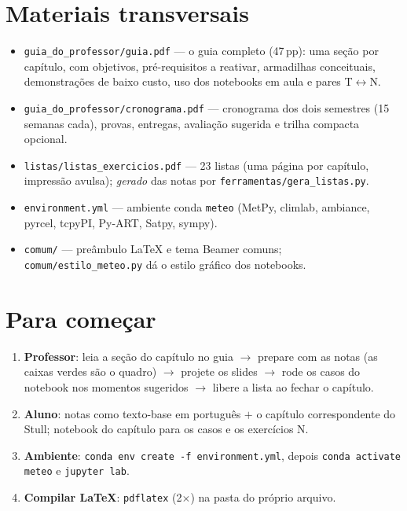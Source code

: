 \documentclass[11pt]{article}
\begin{document}
\section*{Materiais transversais}

\begin{itemize}
  \item \texttt{guia\_do\_professor/guia.pdf} --- o guia completo
        (47\,pp): uma seção por capítulo, com objetivos,
        pré-requisitos a reativar, armadilhas conceituais,
        demonstrações de baixo custo, uso dos notebooks em aula e
        pares T$\leftrightarrow$N.
  \item \texttt{guia\_do\_professor/cronograma.pdf} --- cronograma
        dos dois semestres (15 semanas cada), provas, entregas,
        avaliação sugerida e trilha compacta opcional.
  \item \texttt{listas/listas\_exercicios.pdf} --- 23 listas (uma
        página por capítulo, impressão avulsa); \emph{gerado} das
        notas por \texttt{ferramentas/gera\_listas.py}.
  \item \texttt{environment.yml} --- ambiente conda \texttt{meteo}
        (MetPy, climlab, ambiance, pyrcel, tcpyPI, Py-ART, Satpy,
        sympy).
  \item \texttt{comum/} --- preâmbulo LaTeX e tema Beamer comuns;
        \texttt{comum/estilo\_meteo.py} dá o estilo gráfico dos
        notebooks.
\end{itemize}

\section*{Para começar}

\begin{enumerate}
  \item \textbf{Professor}: leia a seção do capítulo no guia
        $\to$ prepare com as notas (as caixas verdes são o quadro)
        $\to$ projete os slides $\to$ rode os casos do notebook nos
        momentos sugeridos $\to$ libere a lista ao fechar o capítulo.
  \item \textbf{Aluno}: notas como texto-base em português $+$ o
        capítulo correspondente do Stull; notebook do capítulo para
        os casos e os exercícios N.
  \item \textbf{Ambiente}: \texttt{conda env create -f
        environment.yml}, depois \texttt{conda activate meteo} e
        \texttt{jupyter lab}.
  \item \textbf{Compilar LaTeX}: \texttt{pdflatex} (2$\times$) na
        pasta do próprio arquivo.
\end{enumerate}
\end{document}

